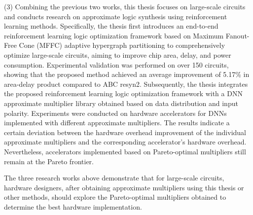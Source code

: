 \begin{abstract*}
    (3) Combining the previous two works, this thesis focuses on large-scale circuits and conducts research on approximate logic synthesis using reinforcement learning methods. Specifically, the thesis first introduces an end-to-end reinforcement learning logic optimization framework based on Maximum Fanout-Free Cone (MFFC) adaptive hypergraph partitioning to comprehensively optimize large-scale circuits, aiming to improve chip area, delay, and power consumption. Experimental validation was performed on over 150 circuits, showing that the proposed method achieved an average improvement of 5.17\% in area-delay product compared to ABC resyn2.
    Subsequently, the thesis integrates the proposed reinforcement learning logic optimization framework with a DNN approximate multiplier library obtained based on data distribution and input polarity. Experiments were conducted on hardware accelerators for DNNs implemented with different approximate multipliers. The results indicate a certain deviation between the hardware overhead improvement of the individual approximate multipliers and the corresponding accelerator's hardware overhead. Nevertheless, accelerators implemented based on Pareto-optimal multipliers still remain at the Pareto frontier.
    
    The three research works above demonstrate that for large-scale circuits, hardware designers, after obtaining approximate multipliers using this thesis or other methods, should explore the Pareto-optimal multipliers obtained to determine the best hardware implementation.
    
\end{abstract*}